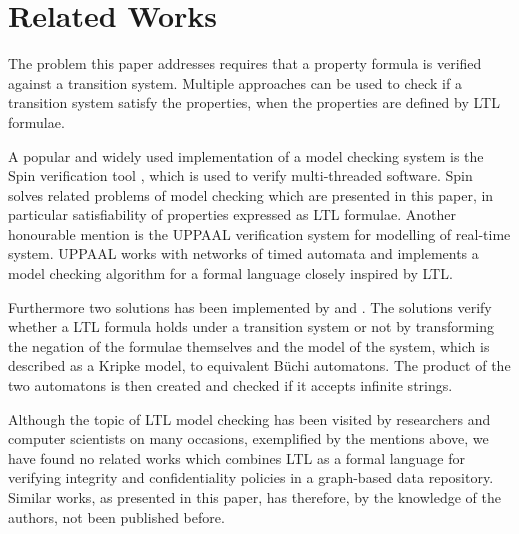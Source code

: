 \section{Related Works}
The problem this paper addresses requires that a property formula is verified against a transition system. Multiple approaches can be used to check if a transition system satisfy the properties, when the properties are defined by LTL formulae.

A popular and widely used implementation of a model checking system is the Spin verification tool \cite{spin}, which is used to verify multi-threaded software. Spin solves related problems of model checking which are presented in this paper, in particular satisfiability of properties expressed as LTL formulae. Another honourable mention is the UPPAAL verification system \cite{uppaal} for modelling of real-time system. UPPAAL works with networks of timed automata and implements a model checking algorithm for a formal language closely inspired by LTL.

Furthermore two solutions has been implemented by \cite{jpsember} and \cite{serejke}. The solutions verify whether a LTL formula holds under a transition system or not by transforming the negation of the formulae themselves and the model of the system, which is described as a Kripke model, to equivalent Büchi automatons. The product of the two automatons is then created and checked if it accepts infinite strings.

Although the topic of LTL model checking has been visited by researchers and computer scientists on many occasions, exemplified by the mentions above, we have found no related works which combines LTL as a formal language for verifying integrity and confidentiality policies in a graph-based data repository. Similar works, as presented in this paper, has therefore, by the knowledge of the authors, not been published before.


